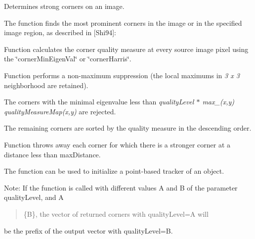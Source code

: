 Determines strong corners on an image.

The function finds the most prominent corners in the image or in the specified image region, as described in \mbox{[}Shi94\mbox{]}\+:


\begin{DoxyItemize}
\item Function calculates the corner quality measure at every source image pixel using the \char`\"{}corner\+Min\+Eigen\+Val\char`\"{} or \char`\"{}corner\+Harris\char`\"{}. 
\item Function performs a non-\/maximum suppression (the local maximums in {\itshape 3 x 3} neighborhood are retained). 
\item The corners with the minimal eigenvalue less than {\itshape quality\+Level $\ast$ max\+\_\+(x,y) quality\+Measure\+Map(x,y)} are rejected. 
\item The remaining corners are sorted by the quality measure in the descending order. 
\item Function throws away each corner for which there is a stronger corner at a distance less than {\ttfamily max\+Distance}. 
\end{DoxyItemize}

The function can be used to initialize a point-\/based tracker of an object.

Note\+: If the function is called with different values {\ttfamily A} and {\ttfamily B} of the parameter {\ttfamily quality\+Level}, and {\ttfamily A} \begin{quote}
\{B\}, the vector of returned corners with {\ttfamily quality\+Level=A} will \end{quote}
be the prefix of the output vector with {\ttfamily quality\+Level=B}.


